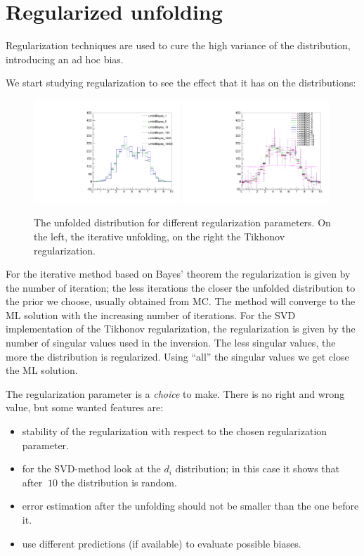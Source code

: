 \documentclass[a4paper,11pt]{article}
\begin{document}
\FloatBarrier
\section{Regularized unfolding}
Regularization techniques are used to cure the high variance of the distribution, introducing an ad hoc bias. 

We start studying regularization to see the effect that it has on the distributions:
\begin{figure}[H]
	\centering
	\includegraphics[width=0.49\textwidth]{figs/unfold-bayes-reg.pdf}
	\includegraphics[width=0.49\textwidth]{figs/unfold-svd-reg.pdf}
	\caption{ \label{fig:sol:reg} The unfolded distribution for different regularization parameters. On the left, the iterative unfolding, on the right the Tikhonov regularization. }
\end{figure}

For the iterative method based on Bayes' theorem the regularization is given by the number of iteration; the less iterations the closer the unfolded distribution to the prior we choose, usually obtained from \gls{MC}. The method will converge to the \gls{ML} solution with the increasing number of iterations.
For the \gls{SVD} implementation of the Tikhonov regularization, the regularization is given by the number of singular values used in the inversion. The less singular values, the more the distribution is regularized. Using ``all'' the singular values we get close the \gls{ML} solution.

The regularization parameter is a \emph{choice} to make. 
There is no right and wrong value, but some wanted features are:
\begin{itemize}
	\item stability of the regularization with respect to the chosen regularization parameter.
	\item for the \gls{SVD}-method look at the $d_i$ distribution; in this case it shows that after $~10$ the distribution is random.
	\item error estimation after the unfolding should not be smaller than the one before it.
	\item use different predictions (if available) to evaluate possible biases.
\end{itemize}
\end{document}

